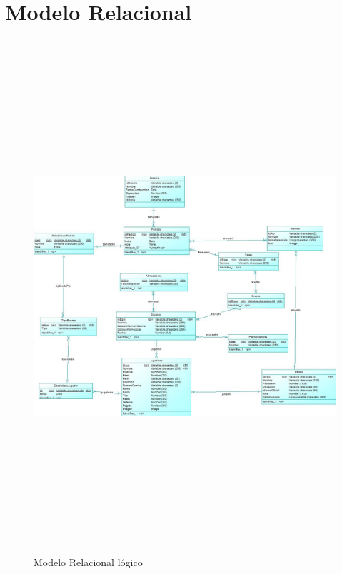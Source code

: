 \section{Modelo Relacional}

\begin{figure}[H]
	\centering
	\includegraphics[width=15cm, height=19cm]{Designe/imgs/model1}
	\caption{Modelo Relacional lógico}
	\label{fig:ModelRel}
\end{figure}

